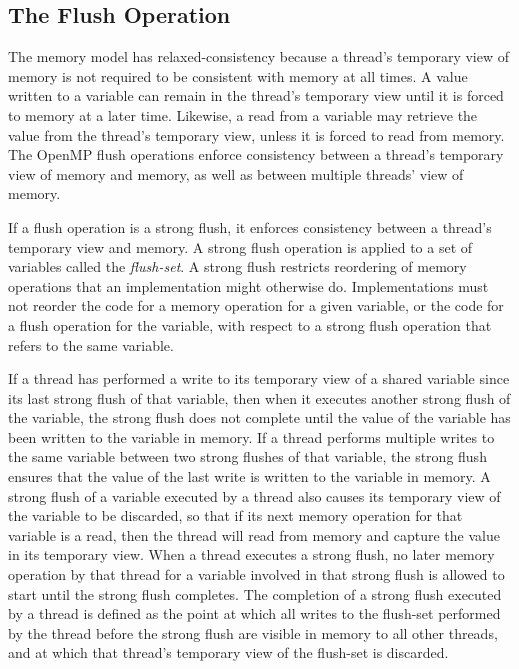 \subsection{The Flush Operation}
\label{subsec:The Flush Operation}


The memory model has relaxed-consistency because a thread's temporary view of
memory is not required to be consistent with memory at all times. A value
written to a variable can remain in the thread's temporary view until it is
forced to memory at a later time. Likewise, a read from a variable may
retrieve the value from the thread's temporary view, unless it is forced to
read from memory.  The OpenMP flush operations enforce consistency between 
a thread's temporary view of memory and memory, as well as between multiple 
threads' view of memory.

If a flush operation is a strong flush, it enforces consistency between a
thread's temporary view and memory.  A strong flush operation is applied to a
set of variables called the \emph{flush-set}. A strong flush restricts
reordering of memory operations that an implementation might otherwise do.
Implementations must not reorder the code for a memory operation for a given
variable, or the code for a flush operation for the variable, with respect to
a strong flush operation that refers to the same variable.

If a thread has performed a write to its temporary view of a shared variable
since its last strong flush of that variable, then when it executes another
strong flush of the variable, the strong flush does not complete until the
value of the variable has been written to the variable in memory. If a thread
performs multiple writes to the same variable between two strong flushes of
that variable, the strong flush ensures that the value of the last write is
written to the variable in memory. A strong flush of a variable executed by a
thread also causes its temporary view of the variable to be discarded, so that
if its next memory operation for that variable is a read, then the thread will
read from memory and capture the value in its temporary view.
When a thread executes a strong flush, no later memory operation by that
thread for a variable involved in that strong flush is allowed to start until
the strong flush completes.  The completion of a strong flush 
executed by a thread is defined as the point at which 
all writes to the flush-set performed by the thread before the strong 
flush are visible in memory to all other threads, and at which that 
thread's temporary view of the flush-set is discarded.

